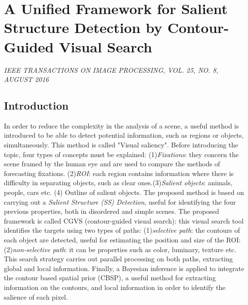 \section{A Unified Framework for Salient Structure Detection by Contour-Guided Visual Search}

\begin{center}
    \author{
    Kai Fu Yang,
    Hui Li,
    Chao-Yi Li,
    and Young-Jie Li,
   \emph{Member}, 
    IEEE
}
\end{center}

\emph{IEEE TRANSACTIONS ON IMAGE PROCESSING, VOL. 25, NO. 8, AUGUST 2016}

\subsection{Introduction}
In order to reduce the complexity in the analysis of a scene, a useful method 
is introduced to be able to detect potential information, such as regions or 
objects, simultaneously. This method is called "Visual saliency". Before introducing
the topic, four types of concepts must be explained: (1)\emph{Fixations}: 
they concern the scene framed by the human eye and are used to compare 
the methods of forecasting fixations. (2)\emph{ROI}: each region contains information 
where there is difficulty in separating objects, such as clear ones.(3)\emph{Salient objects}: 
animals, people, cars etc. (4) Outline of salient objects. The proposed 
method is based on carrying out a \emph{Salient Structure (SS) Detection},
useful for identifying the four previous properties, both in disordered and 
simple scenes. The proposed framework is called CGVS (contour-guided visual 
search): this visual search tool identifies the targets using two types of 
paths: (1)\emph{selective path}: the contours of each object are detected, useful 
for estimating the position and size of the ROI: (2)\emph{non-selective path}: it 
can be properties such as color, luminary, texture etc. This search strategy 
carries out parallel processing on both paths, extracting global and local 
information. Finally, a Bayesian inference is applied to integrate the contour 
based spatial prior (CBSP), a useful method for extracting information on 
the contours, and local information in order to identify the salience of each 
pixel. 